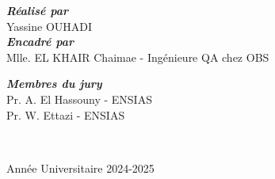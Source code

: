 \begin{titlepage}
\begin{center}
 \vspace{2.8cm}
  
  \begin{minipage}{0.5\textwidth}
    \vspace{-6mm}
  \begin{flushleft} \large
    \emph{\bfseries Réalisé par}\\[0.3cm]
    Yassine OUHADI \\[0.5cm]
    \emph{\bfseries Encadré par} \\[0.3cm]
    Mlle. EL KHAIR Chaimae - Ingénieure QA chez OBS
  \end{flushleft}
\end{minipage}
\begin{minipage}{0.4\textwidth}
  \begin{flushright} \large
    \emph{\bfseries Membres du jury} \\[0.3cm]
    Pr. A. El Hassouny - ENSIAS\\[0.3cm]
    Pr. W. Ettazi - ENSIAS \\

  \end{flushright}
\end{minipage}\\[1cm]


  
  
  

  \vspace{0.4cm} 	
  \begin{center}
    {Année Universitaire 2024-2025}
  \end{center}

   \end{center}
\end{titlepage}